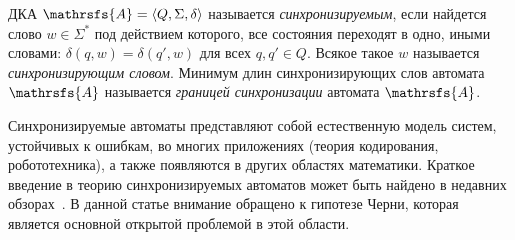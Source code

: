 \documentclass[11pt]{article}
\newcommand{\sa}{synchronizing automata}
\newcommand{\rl}{reset length}
\begin{document}

ДКА $\mathrsfs{A}=\langle Q,\Sigma,\delta\rangle$ называется
\emph{синхронизируемым}, если найдется слово $w\in\Sigma^*$
под действием которого, все состояния переходят в одно, иными словами:
$\delta(q,w)=\delta(q',w)$ для всех $q,q'\in Q$. Всякое такое $w$
называется \emph{синхронизирующим словом}. Минимум длин синхронизирующих
слов автомата $\mathrsfs{A}$ называется \emph{границей синхронизации} автомата
$\mathrsfs{A}$.


Синхронизируемые автоматы представляют собой естественную модель
систем, устойчивых к ошибкам, во многих приложениях (теория кодирования,
робототехника), а также появляются в других областях математики.
Краткое введение в теорию синхронизируемых автоматов может быть найдено
в недавних обзорах~\cite{Sa05,Vo08}. В данной статье внимание обращено к
гипотезе Черни, которая является основной открытой проблемой в этой области.


\end{document}
